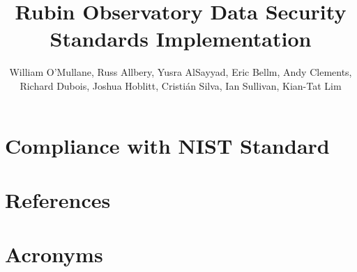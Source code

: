 \documentclass[DM,authoryear,toc]{lsstdoc}
\title{Rubin Observatory Data Security Standards Implementation}
\author{%
William O'Mullane,
Russ Allbery,
Yusra AlSayyad,
Eric Bellm,
Andy Clements,
Richard Dubois,
Joshua Hoblitt,
Cristi\'{a}n Silva,
Ian Sullivan,
Kian-Tat Lim
}
\date{\vcsDate}
\begin{document}
\maketitle


\newpage
\appendix

\section{Compliance with NIST Standard}\label{sec:compliance}


\newpage
\section{References} \label{sec:bib}
\renewcommand{\refname}{} %


\section{Acronyms} \label{sec:acronyms}
%
\printglossaries
\end{document}
